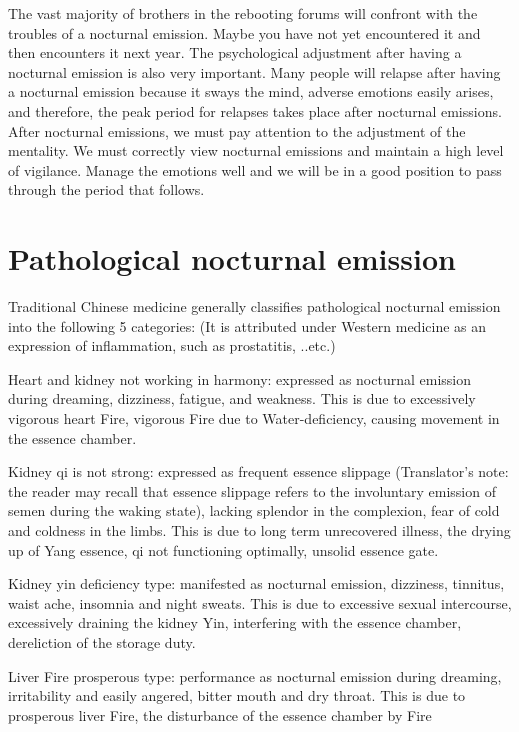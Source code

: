 \documentclass[
]{book}
\begin{document}
The vast majority of brothers in the rebooting forums will confront with the troubles of a nocturnal emission. Maybe you have not yet encountered it and then encounters it next year. The psychological adjustment after having a nocturnal emission is also very important. Many people will relapse after having a nocturnal emission because it sways the mind, adverse emotions easily arises, and therefore, the peak period for relapses takes place after nocturnal emissions. After nocturnal emissions, we must pay attention to the adjustment of the mentality. We must correctly view nocturnal emissions and maintain a high level of vigilance. Manage the emotions well and we will be in a good position to pass through the period that follows.

\hypertarget{pathological-nocturnal-emission}{%
\section{Pathological nocturnal emission}\label{pathological-nocturnal-emission}}

Traditional Chinese medicine generally classifies pathological nocturnal emission into the following 5 categories: (It is attributed under Western medicine as an expression of inflammation, such as prostatitis, ..etc.)

Heart and kidney not working in harmony: expressed as nocturnal emission during dreaming, dizziness, fatigue, and weakness. This is due to excessively vigorous heart Fire, vigorous Fire due to Water-deficiency, causing movement in the essence chamber.

Kidney qi is not strong: expressed as frequent essence slippage (Translator's note: the reader may recall that essence slippage refers to the involuntary emission of semen during the waking state), lacking splendor in the complexion, fear of cold and coldness in the limbs. This is due to long term unrecovered illness, the drying up of Yang essence, qi not functioning optimally, unsolid essence gate.

Kidney yin deficiency type: manifested as nocturnal emission, dizziness, tinnitus, waist ache, insomnia and night sweats. This is due to excessive sexual intercourse, excessively draining the kidney Yin, interfering with the essence chamber, dereliction of the storage duty.

Liver Fire prosperous type: performance as nocturnal emission during dreaming, irritability and easily angered, bitter mouth and dry throat. This is due to prosperous liver Fire, the disturbance of the essence chamber by Fire
\end{document}
